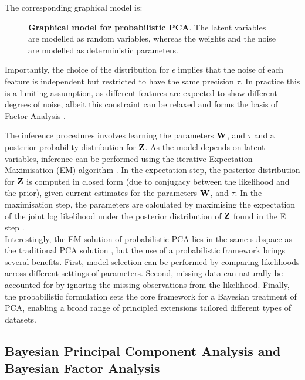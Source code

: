 The corresponding graphical model is:
\begin{figure}[H]
	\centering
	
	\caption{\textbf{Graphical model for probabilistic PCA}. The latent variables are modelled as random variables, whereas the weights and the noise are modelled as deterministic parameters.}
	\label{fig:pPCA}
\end{figure}

Importantly, the choice of the distribution for $\epsilon$ implies that the noise of each feature is independent but restricted to have the same precision $\tau$. In practice this is a limiting assumption, as different features are expected to show different degrees of noise, albeit this constraint can be relaxed and forms the basis of Factor Analysis \cite{Rubin1982,Bishop2006}.

The inference procedures involves learning the parameters ${\bf W}$, and $\tau$ and a posterior probability distribution for ${\bf Z}$. As the model depends on latent variables, inference can be performed using the iterative Expectation-Maximisation (EM) algorithm \cite{Rubin1982,Bishop2006}. In the expectation step, the posterior distribution for ${\bf Z}$ is computed in closed form (due to conjugacy between the likelihood and the prior), given current estimates for the parameters ${\bf W}$, and $\tau$. In the maximisation step, the parameters are calculated by maximising the expectation of the joint log likelihood under the posterior distribution of ${\bf Z}$ found in the E step \cite{Tipping1999}.\\
Interestingly, the EM solution of probabilistic PCA lies in the same subspace as the traditional PCA solution \cite{Tipping1999}, but the use of a probabilistic framework brings several benefits. First, model selection can be performed by comparing likelihoods across different settings of parameters. Second, missing data can naturally be accounted for by ignoring the missing observations from the likelihood. Finally, the probabilistic formulation sets the core framework for a Bayesian treatment of PCA, enabling a broad range of principled extensions tailored different types of datasets.


\subsection{Bayesian Principal Component Analysis and Bayesian Factor Analysis} \label{section:bayesian_pca}

